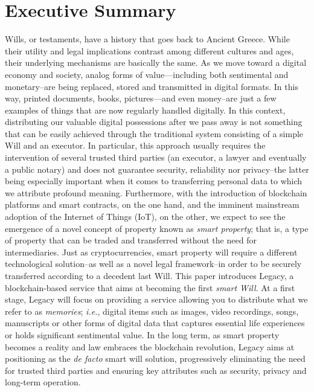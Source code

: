 \chapter{Executive Summary} %
\label{cha:executive_summary}

Wills, or testaments, have a history that goes back to Ancient Greece. While their utility and legal implications contrast among different cultures and ages, their underlying mechanisms are basically the same. As we move toward a digital economy and society, analog forms of value---including both sentimental and monetary--are being replaced, stored and transmitted in digital formats. In this way, printed documents, books, pictures---and even money--are just a few examples of things that are now regularly handled digitally. In this context, distributing our valuable digital possessions after we pass away is not something that can be easily achieved through the traditional system consisting of a simple Will and an executor. In particular, this approach usually requires the intervention of several trusted third parties (an executor, a lawyer and eventually a public notary) and does not guarantee security, reliability nor privacy--the latter being especially important when it comes to transferring personal data to which we attribute profound meaning. Furthermore, with the introduction of blockchain platforms and smart contracts, on the one hand, and the imminent mainstream adoption of the Internet of Things (IoT), on the other, we expect to see the emergence of a novel concept of property known as \textit{smart property}; that is, a type of property that can be traded and transferred without the need for intermediaries. Just as cryptocurrencies, smart property will require a different technological solution--as well as a novel legal framework--in order to be securely transferred according to a decedent last Will.
This paper introduces Legacy, a blockchain-based service that aims at becoming the first \textit{smart Will}. At a first stage, Legacy will focus on providing a service allowing you to distribute what we refer to as \textit{memories}; \textit{i.e.}, digital items such as images, video recordings, songs, manuscripts or other forms of digital data that captures essential life experiences or holds significant sentimental value. In the long term, as smart property becomes a reality and law embraces the blockchain revolution, Legacy aims at positioning as the \textit{de facto} smart will solution, progressively eliminating the need for trusted third parties and ensuring key attributes such as security, privacy and long-term operation.

